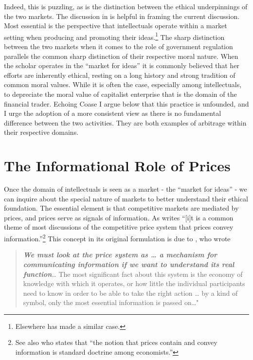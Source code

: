 \documentclass[11pt,]{article}
\begin{document}
Indeed, this is puzzling, as is the distinction between the ethical
underpinnings of the two markets. The discussion in \citet{Coase1974} is
helpful in framing the current discussion. Most essential is the
perspective that intellectuals operate within a market setting when
producing and promoting their ideas.\footnote{Elsewhere
  \citet{Polanyi2000} has made a similar case.} The sharp distinction
between the two markets when it comes to the role of government
regulation parallels the common sharp distinction of their respective
moral nature. When the scholar operates in the ``market for ideas'' it
is commonly believed that her efforts are inherently ethical, resting on
a long history and strong tradition of common moral values. While it is
often the case, especially among intellectuals, to depreciate the moral
value of capitalist enterprise that is the domain of the financial
trader. Echoing Coase I argue below that this practice is unfounded, and
I urge the adoption of a more consistent view as there is no fundamental
difference between the two activities. They are both examples of
arbitrage within their respective domains.

\section{The Informational Role of
Prices}\label{the-informational-role-of-prices}

Once the domain of intellectuals is seen as a market - the ``market for
ideas'' - we can inquire about the special nature of markets to better
understand their ethical foundation. The essential element is that
competitive markets are mediated by prices, and prices serve as signals
of information. As \citet{Grossman1989} writes ``{[}i{]}t is a common
theme of most discussions of the competitive price system that prices
convey information.''\footnote{See also \citet{Kreps1988} who states
  that ``the notion that prices contain and convey information is
  standard doctrine among economists.''} This concept in its original
formulation is due to \citet{Hayek1945}, who wrote

\begin{quote}
\textbf{\emph{We must look at the price system as \ldots{} a mechanism
for communicating information if we want to understand its real
function}}\ldots{} The most significant fact about this system is the
economy of knowledge with which it operates, or how little the
individual participants need to know in order to be able to take the
right action \ldots{} by a kind of symbol, only the most essential
information is passed on\ldots{}"
\end{quote}
\end{document}
